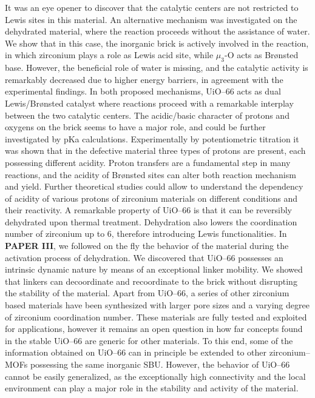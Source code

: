 It was an eye opener to discover that the catalytic centers are not restricted to Lewis sites in this material. 
An alternative mechanism was investigated on the dehydrated material, where the reaction proceeds without the assistance of water. We show that in this case, the inorganic brick is actively involved in the reaction, in which zirconium plays a role as Lewis acid site, while $\mu_{3}$-O acts as Br\o{}nsted base. However, the beneficial role of water is missing, and the catalytic activity is remarkably decreased due to higher energy barriers, in agreement with the experimental findings. 
In both proposed mechanisms, UiO--66 acts as dual Lewis/Br\o{}nsted catalyst where reactions proceed with a remarkable interplay between the two catalytic centers. The acidic/basic character of protons and oxygens on the brick seems to have a major role, and could be further investigated by pKa calculations. Experimentally by potentiometric titration it was shown that in the defective material three types of protons are present, each possessing different acidity. Proton transfers are a fundamental step in many reactions, and the acidity of Br\o{}nsted sites can alter both reaction mechanism and yield. Further theoretical studies could allow to understand the dependency of acidity of various protons of zirconium materials on different conditions and their reactivity.
\npar
A remarkable property of UiO--66 is that it can be reversibly dehydrated upon thermal treatment. Dehydration also lowers the coordination number of zirconium up to 6, therefore introducing Lewis functionalities. In \textbf{PAPER III}, we followed on the fly the behavior of the material during the activation process of dehydration. We discovered that UiO--66 possesses an intrinsic dynamic nature by means of an exceptional linker mobility. We showed that linkers can decoordinate and recoordinate to the brick without disrupting the stability of the material.
\npar
Apart from UiO--66, a series of other zirconium based materials have been synthesized with larger pore sizes and a varying degree of zirconium coordination number. These materials are fully tested and exploited for applications, however it remains an open question in how far concepts found in the stable UiO--66 are generic for other materials. To this end, some of the information obtained on UiO--66 can in principle be extended to other zirconium--MOFs possessing the same inorganic SBU. However, the behavior of UiO--66 cannot be easily generalized, as the exceptionally high connectivity and the local environment can play a major role in the stability and activity of the material. 
